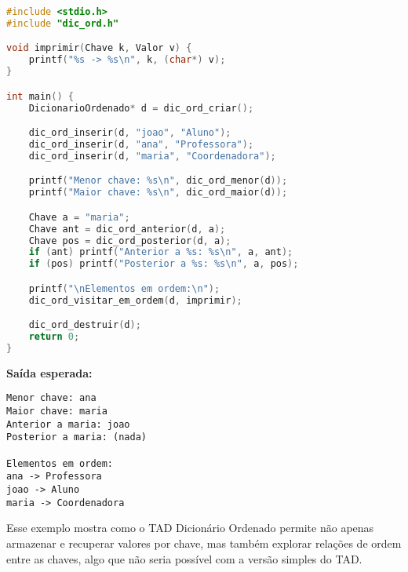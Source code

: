 \begin{lstlisting}[language=C, caption={Exemplo de uso do Dicionário Ordenado}, label={lst:uso-dicionario-ordenado}]
#include <stdio.h>
#include "dic_ord.h"

void imprimir(Chave k, Valor v) {
	printf("%s -> %s\n", k, (char*) v);
}

int main() {
	DicionarioOrdenado* d = dic_ord_criar();

	dic_ord_inserir(d, "joao", "Aluno");
	dic_ord_inserir(d, "ana", "Professora");
	dic_ord_inserir(d, "maria", "Coordenadora");

	printf("Menor chave: %s\n", dic_ord_menor(d));
	printf("Maior chave: %s\n", dic_ord_maior(d));

	Chave a = "maria";
	Chave ant = dic_ord_anterior(d, a);
	Chave pos = dic_ord_posterior(d, a);
	if (ant) printf("Anterior a %s: %s\n", a, ant);
	if (pos) printf("Posterior a %s: %s\n", a, pos);

	printf("\nElementos em ordem:\n");
	dic_ord_visitar_em_ordem(d, imprimir);

	dic_ord_destruir(d);
	return 0;
}
\end{lstlisting}

\textbf{Saída esperada:}
\begin{verbatim}
Menor chave: ana
Maior chave: maria
Anterior a maria: joao
Posterior a maria: (nada)

Elementos em ordem:
ana -> Professora
joao -> Aluno
maria -> Coordenadora
\end{verbatim}

Esse exemplo mostra como o TAD Dicionário Ordenado permite não apenas armazenar e recuperar valores por chave, mas também explorar relações de ordem entre as chaves, algo que não seria possível com a versão simples do TAD.